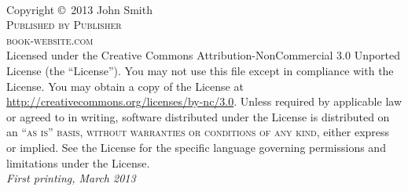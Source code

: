 \documentclass[11pt]{book} %
\begin{document}

\begingroup
\thispagestyle{empty}
\vfill
\endgroup


\newpage
~\vfill
\thispagestyle{empty}

\noindent Copyright \copyright\ 2013 John Smith\\ %

\noindent \textsc{Published by Publisher}\\ %

\noindent \textsc{book-website.com}\\ %

\noindent Licensed under the Creative Commons Attribution-NonCommercial 3.0 Unported License (the ``License''). You may not use this file except in compliance with the License. You may obtain a copy of the License at \url{http://creativecommons.org/licenses/by-nc/3.0}. Unless required by applicable law or agreed to in writing, software distributed under the License is distributed on an \textsc{``as is'' basis, without warranties or conditions of any kind}, either express or implied. See the License for the specific language governing permissions and limitations under the License.\\ %

\noindent \textit{First printing, March 2013} %

\end{document}
